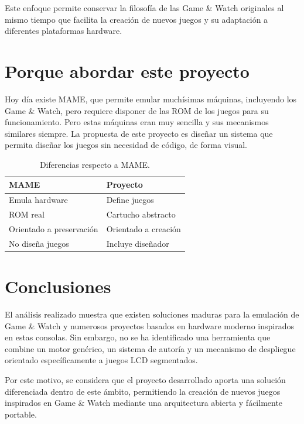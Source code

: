 \documentclass[../main.tex]{subfiles}
\begin{document}
	Este enfoque permite conservar la filosofía de las Game \& Watch originales al mismo tiempo que facilita la creación de nuevos juegos y su adaptación a diferentes plataformas hardware.

\section{Porque abordar este proyecto}
\label{sec:Porque desarrollar}
Hoy día existe MAME, que permite emular muchísimas máquinas, incluyendo los Game \& Watch, pero requiere disponer de las ROM de los juegos para su funcionamiento. Pero estas máquinas eran muy sencilla y sus mecanismos similares siempre. La propuesta de este proyecto es diseñar un sistema que permita diseñar los juegos sin necesidad de código, de forma visual.

\begin{table}[H]
	\centering
	\small
	\renewcommand{\arraystretch}{1.3}
	
	\begin{tabular}{|l|l|}
		\hline
		\textbf{MAME} & \textbf{Proyecto} \\ 
		\hline
		Emula hardware & Define juegos \\ 
		\hline
		ROM real & Cartucho abstracto \\ 
		\hline
		Orientado a preservación & Orientado a creación \\ 
		\hline
		No diseña juegos & Incluye diseñador \\ 
		\hline
	\end{tabular}
	
	\caption{Diferencias respecto a MAME.}
	\label{tab:diferencias_mame}
\end{table}

	\section{Conclusiones}
	El análisis realizado muestra que existen soluciones maduras para la emulación de Game \& Watch y numerosos proyectos basados en hardware moderno inspirados en estas consolas. Sin embargo, no se ha identificado una herramienta que combine un motor genérico, un sistema de autoría y un mecanismo de despliegue orientado específicamente a juegos LCD segmentados.

	Por este motivo, se considera que el proyecto desarrollado aporta una solución diferenciada dentro de este ámbito, permitiendo la creación de nuevos juegos inspirados en Game \& Watch mediante una arquitectura abierta y fácilmente portable.
\end{document}

